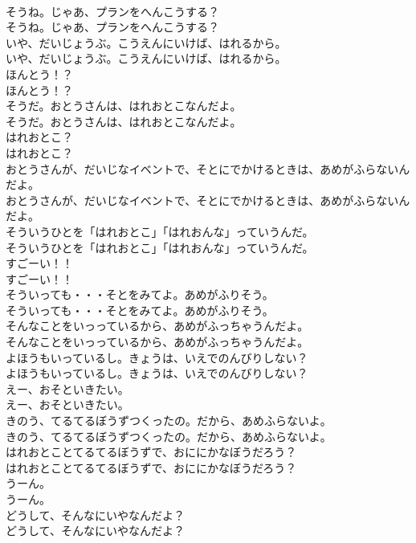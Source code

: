 \documentclass[8pt]{extreport}
\begin{document}
\begin{CJK}{UTF8}{min}
\\	そうね。じゃあ、プランをへんこうする？
\\	そうね。じゃあ、プランをへんこうする？
\\	いや、だいじょうぶ。こうえんにいけば、はれるから。
\\	いや、だいじょうぶ。こうえんにいけば、はれるから。
\\	ほんとう！？
\\	ほんとう！？
\\	そうだ。おとうさんは、はれおとこなんだよ。
\\	そうだ。おとうさんは、はれおとこなんだよ。
\\	はれおとこ？
\\	はれおとこ？
\\	おとうさんが、だいじなイベントで、そとにでかけるときは、あめがふらないんだよ。
\\	おとうさんが、だいじなイベントで、そとにでかけるときは、あめがふらないんだよ。
\\	そういうひとを「はれおとこ」「はれおんな」っていうんだ。
\\	そういうひとを「はれおとこ」「はれおんな」っていうんだ。
\\	すごーい！！
\\	すごーい！！
\\	そういっても・・・そとをみてよ。あめがふりそう。
\\	そういっても・・・そとをみてよ。あめがふりそう。
\\	そんなことをいっっているから、あめがふっちゃうんだよ。
\\	そんなことをいっっているから、あめがふっちゃうんだよ。
\\	よほうもいっているし。きょうは、いえでのんびりしない？
\\	よほうもいっているし。きょうは、いえでのんびりしない？
\\	えー、おそといきたい。
\\	えー、おそといきたい。
\\	きのう、てるてるぼうずつくったの。だから、あめふらないよ。
\\	きのう、てるてるぼうずつくったの。だから、あめふらないよ。
\\	はれおとことてるてるぼうずで、おににかなぼうだろう？
\\	はれおとことてるてるぼうずで、おににかなぼうだろう？
\\	うーん。
\\	うーん。
\\	どうして、そんなにいやなんだよ？
\\	どうして、そんなにいやなんだよ？

\end{CJK}
\end{document}
